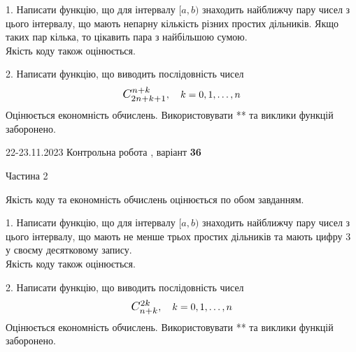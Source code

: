 \documentclass[12pt, ukrainian]{article}
\begin{document}
{{{{{{{\begin {Large}
1. Написати функцію, що для інтервалу $[a, b)$ знаходить найближчу пару чисел з цього інтервалу, що мають непарну кількість різних простих дільників. Якщо таких пар кілька, то цікавить пара з найбільшою сумою.\\	Якість коду також оцінюється. 



\vspace{10mm}



2. 
Написати функцію, що виводить послідовність чисел
$$\scalebox{1.2}{$C_{2n+k+1}^{n+k}$}, \quad k=0,1,\ldots,n$$
Оцінюється економність обчислень. Використовувати ** та виклики функцій заборонено.

\end{Large}\newpage




\begin {Huge}
{{22-23.11.2023 Контрольна робота , варіант  \No \textbf { 36 }\par}}

\begin{center}Частина 2
\end{center}
\vspace{10mm}
\end {Huge}

{
\begin {Large}
Якість коду та економність обчислень оцінюється по обом завданням.

\vspace{5mm}

1. Написати функцію, що для інтервалу $[a, b)$ знаходить найближчу пару чисел з цього інтервалу, що мають не менше трьох простих дільників та мають цифру 3 у своєму десятковому запису.\\	Якість коду також оцінюється. 



\vspace{10mm}



2. 
Написати функцію, що виводить послідовність чисел
$$\scalebox{1.2}{$C_{n+k}^{2k}$}, \quad k=0,1,\ldots,n$$
Оцінюється економність обчислень. Використовувати ** та виклики функцій заборонено.

\end{Large}\newpage




}}}}}}}}
\end{document}
